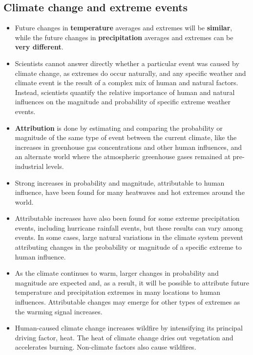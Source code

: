 \documentclass[11pt]{article}
\begin{document}
\subsection{Climate change and extreme events}
\label{sec:orgd517850}
\begin{itemize}
\item Future changes in \textbf{temperature} averages and extremes will be \textbf{similar}, while the future changes in \textbf{precipitation} averages and extremes can be \textbf{very different}.
\item Scientists cannot answer directly whether a particular event was caused by climate change, as extremes do occur naturally, and any specific weather and climate event is the result of a complex mix of human and natural factors. Instead, scientists quantify the relative importance of human and natural influences on the magnitude and probability of specific extreme weather events.
\item \textbf{Attribution} is done by estimating and comparing the probability or magnitude of the same type of event between the current climate, like the increases in greenhouse gas concentrations and other human influences, and an alternate world where the atmospheric greenhouse gases remained at pre-industrial levels.
\item Strong increases in probability and magnitude, attributable to human influence, have been found for many heatwaves and hot extremes around the world.
\item Attributable increases have also been found for some extreme precipitation events, including hurricane rainfall events, but these results can vary among events. In some cases, large natural variations in the climate system prevent attributing changes in the probability or magnitude of a specific extreme to human influence.
\item As the climate continues to warm, larger changes in probability and magnitude are expected and, as a result, it will be possible to attribute future temperature and precipitation extremes in many locations to human influences. Attributable changes may emerge for other types of extremes as the warming signal increases.
\item Human-caused climate change increases wildfire by intensifying its principal driving factor, heat. The heat of climate change dries out vegetation and accelerates burning. Non-climate factors also cause wildfires.
\end{itemize}
\end{document}
